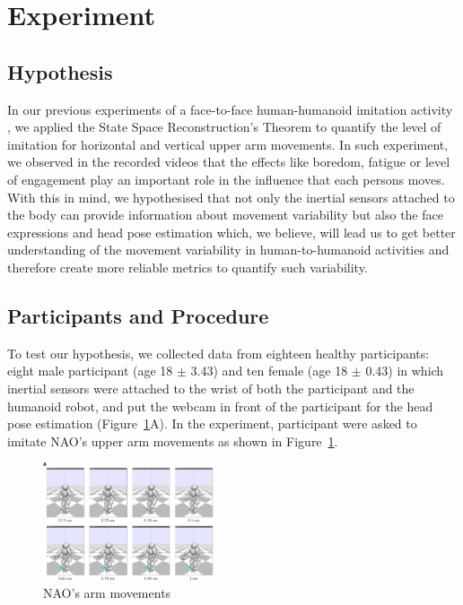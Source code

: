 \documentclass{sigchi}
\begin{document}
\section{Experiment}

\subsection{Hypothesis}
In our previous experiments of a face-to-face human-humanoid imitation
activity \cite{XXX2017}, we applied the State Space Reconstruction's Theorem
to quantify the level of imitation for horizontal and vertical upper arm movements.
In such experiment, we observed in the recorded videos that the effects like
boredom, fatigue or level of engagement play an important role in the influence
that each persons moves.
With this in mind, we hypothesised that not only the inertial sensors attached
to the body can provide information about movement variability but also the
face expressions and head pose estimation which, we believe, will lead us
to get better understanding of the movement variability in human-to-humanoid
activities and therefore create more reliable metrics to quantify such variability.


\subsection{Participants and Procedure}
To test our hypothesis, we collected data from eighteen healthy participants:
eight male participant (age 18 $\pm$ 3.43) and ten female (age 18 $\pm$ 0.43)
in which inertial sensors were attached to the wrist of both the participant and the
humanoid robot, and put the webcam in front of the participant for the head pose
estimation (Figure~\ref{fig:exp}A).
In the experiment, participant were asked to imitate NAO's upper arm movements
as shown in Figure~\ref{fig:exp}.

\begin{figure}
\centering
\includegraphics[width=0.45\textwidth]{figures/nao/fig3A}
\caption[PA]{NAO's arm movements}
\label{fig:exp}
\end{figure}
\end{document}
